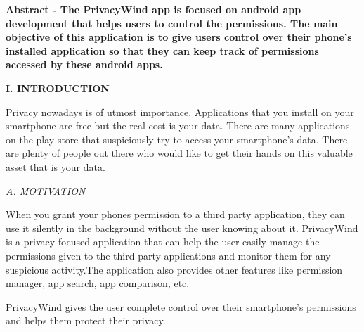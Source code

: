 \documentclass[12pt]{report}
\renewcommand{\_}{\kern-1.5pt\textunderscore\kern-1.5pt}
\begin{document}
\begin{multicols}{2}

\vspace{\baselineskip}
\begin{justify}
{\fontsize{10pt}{12.0pt}\selectfont \textbf{Abstract - The PrivacyWind app is focused on android app development that helps users to control the permissions. The main objective of this application is to give users control over their phone’s installed application so that they can keep track of permissions accessed by these android apps.}\par}
\end{justify}

\vspace{\baselineskip}
\begin{Center}
\textbf{I. INTRODUCTION}
\end{Center}

\vspace{\baselineskip}
\begin{justify}
{\fontsize{10pt}{12.0pt}\selectfont Privacy nowadays is of utmost importance. Applications that you install on your smartphone are free but the real cost is your data. There are many applications on the play store that suspiciously try to access your smartphone’s data. There are plenty of people out there who would like to get their hands on this valuable asset that is your data.\par}
\end{justify}

\vspace{\baselineskip}
\begin{justify}
{\fontsize{10pt}{12.0pt}\selectfont \textit{A. MOTIVATION}}
\end{justify}
\begin{justify}
{\fontsize{10pt}{12.0pt}\selectfont When you grant your phones permission to a third party application, they can use it silently in the background without the user knowing about it. PrivacyWind is a privacy focused application that can help the user easily manage the permissions given to the third party applications and monitor them for any suspicious activity.The application also provides other features like permission manager, app search, app comparison, etc.\par}
\end{justify}
\begin{justify}
{\fontsize{10pt}{12.0pt}\selectfont PrivacyWind gives the user complete control over their smartphone's permissions and helps them protect their privacy.\par}
\end{justify}


\end{multicols}
\end{document}
